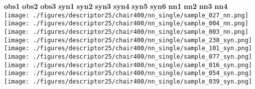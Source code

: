 \documentclass[10pt,twocolumn,letterpaper]{article}
\begin{document}
\begin{figure*}[h]
	\centering	
\textbf{{\footnotesize obs1}}\hspace{6mm} \textbf{{\footnotesize obs2}} \hspace{6mm} \textbf{{\footnotesize obs3}} \hspace{6mm} \textbf{{\footnotesize syn1}} \hspace{6mm} \textbf{{\footnotesize syn2}} \hspace{6mm} \textbf{{\footnotesize syn3}} \hspace{6mm} \textbf{{\footnotesize syn4}} \hspace{6mm}
\textbf{{\footnotesize syn5}} \hspace{6mm} \textbf{{\footnotesize syn6}} \hspace{6mm} \textbf{{\footnotesize nn1}} \hspace{6mm}
\textbf{{\footnotesize nn2}} \hspace{6mm} \textbf{{\footnotesize nn3}} \hspace{6mm}
\textbf{{\footnotesize nn4}} \\
	\texttt{[image: ./figures/descriptor25/chair400/nn\_single/sample\_027\_nn.png]} \hspace{-3mm} 
	\texttt{[image: ./figures/descriptor25/chair400/nn\_single/sample\_004\_nn.png]} \hspace{-3mm} 
	\texttt{[image: ./figures/descriptor25/chair400/nn\_single/sample\_003\_nn.png]} \hspace{-3mm}
    \texttt{[image: ./figures/descriptor25/chair400/nn\_single/sample\_238\_syn.png]} \hspace{-3mm}	
    \texttt{[image: ./figures/descriptor25/chair400/nn\_single/sample\_101\_syn.png]} \hspace{-3mm}	
    \texttt{[image: ./figures/descriptor25/chair400/nn\_single/sample\_077\_syn.png]} \hspace{-3mm}	
    \texttt{[image: ./figures/descriptor25/chair400/nn\_single/sample\_016\_syn.png]} \hspace{-3mm}	
    \texttt{[image: ./figures/descriptor25/chair400/nn\_single/sample\_054\_syn.png]} \hspace{-2mm}	
     \texttt{[image: ./figures/descriptor25/chair400/nn\_single/sample\_039\_syn.png]}  \hspace{-2mm}   

\end{figure*}
\end{document}
